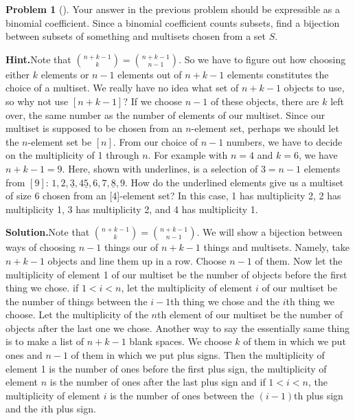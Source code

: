 \documentclass[10pt,]{book}
\theoremstyle{plain}
\theoremstyle{definition}
\newtheorem{activity}[project]{Problem}
\theoremstyle{definition}
\numberwithin{equation}{chapter}
\newcommand{\lt}{<}
\begin{document}
\begin{activity}[]\label{activity-126}
Your answer in the previous problem should be expressible as a binomial coefficient. Since a binomial coefficient counts subsets, find a bijection between subsets of something and multisets chosen from a set \(S\).%
\par\medskip\noindent%
\textbf{Hint.}\quad Note that \(\binom{n+k-1}{k} = \binom{n+k-1}{n-1}\). So we have to figure out how choosing either \(k\) elements or \(n - 1\) elements out of \(n + k - 1\) elements constitutes the choice of a multiset. We really have no idea what set of \(n + k - 1\) objects to use, so why not use \([n + k - 1]\)? If we choose \(n - 1\) of these objects, there are \(k\) left over, the same number as the number of elements of our multiset. Since our multiset is supposed to be chosen from an \(n\)-element set, perhaps we should let the \(n\)-element set be \([n]\). From our choice of \(n - 1\) numbers, we have to decide on the multiplicity of 1 through \(n\). For example with \(n = 4\) and \(k = 6\), we have \(n+k-1=9\). Here, shown with underlines, is a selection of \(3=n-1\) elements from \([9]\): \(1, 2, \underline{3}, 4 \underline{5}, 6, 7, \underline{8}, 9\). How do the underlined elements give us a multiset of size 6 chosen from an [4]-element set? In this case, 1 has multiplicity 2, 2 has multiplicity 1, 3 has multiplicity 2, and 4 has multiplicity 1.%
\par\medskip\noindent%
\textbf{Solution.}\quad Note that \(\binom{n+k-1}{k} = \binom{n+k-1}{n-1}\). We will show a bijection between ways of choosing \(n-1\) things our of \(n+k-1\) things and multisets. Namely, take \(n+k-1\) objects and line them up in a row. Choose \(n-1\) of them. Now let the multiplicity of element 1 of our multiset be the number of objects before the first thing we chose.  if \(1\lt i\lt n\), let the multiplicity of element \(i\) of our multiset be the number of things between the \(i-1\)th thing we chose and the \(i\)th thing we choose. Let the multiplicity of the \(n\)th element of our multiset be the number of objects after the last one we chose. Another way to say the essentially same thing is to make a list of \(n+k-1\) blank spaces. We choose \(k\) of them in which we put ones and \(n-1\) of them in which we put plus signs. Then the multiplicity of element 1 is the number of ones before the first plus sign, the multiplicity of element \(n\) is the number of ones after the last plus sign and if \(1\lt i\lt n\), the multiplicity of element \(i\) is the number of ones between the \((i-1)\)th plus sign and the \(i\)th plus sign.%
\end{activity}
\end{document}
